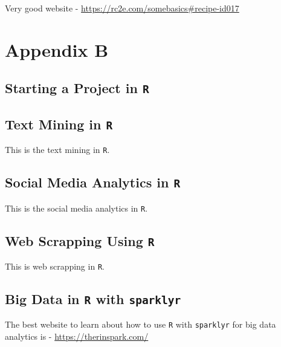 \documentclass[
]{book}
\begin{document}
Very good website - \url{https://rc2e.com/somebasics\#recipe-id017}

\hypertarget{appendix-b}{%
\chapter{Appendix B}\label{appendix-b}}

\hypertarget{rproject}{%
\section{\texorpdfstring{Starting a Project in \texttt{R}}{Starting a Project in R}}\label{rproject}}

\hypertarget{text-mining-in-r}{%
\section{\texorpdfstring{Text Mining in \texttt{R}}{Text Mining in R}}\label{text-mining-in-r}}

This is the text mining in \texttt{R}.

\hypertarget{social-media-analytics-in-r}{%
\section{\texorpdfstring{Social Media Analytics in \texttt{R}}{Social Media Analytics in R}}\label{social-media-analytics-in-r}}

This is the social media analytics in \texttt{R}.

\hypertarget{web-scrapping-using-r}{%
\section{\texorpdfstring{Web Scrapping Using \texttt{R}}{Web Scrapping Using R}}\label{web-scrapping-using-r}}

This is web scrapping in \texttt{R}.

\hypertarget{big-data-in-r-with-sparklyr}{%
\section{\texorpdfstring{Big Data in \texttt{R} with \texttt{sparklyr}}{Big Data in R with sparklyr}}\label{big-data-in-r-with-sparklyr}}

The best website to learn about how to use \texttt{R} with \texttt{sparklyr} for big data analytics is - \url{https://therinspark.com/}

\backmatter

  
\end{document}
